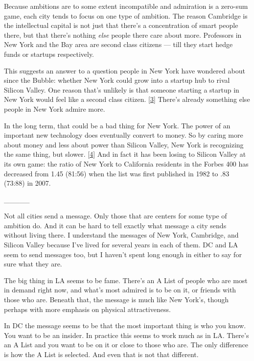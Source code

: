 Because ambitions are to some extent incompatible and admiration is a
zero-sum game, each city tends to focus on one type of ambition. The
reason Cambridge is the intellectual capital is not just that there's a
concentration of smart people there, but that there's nothing
\emph{else} people there care about more. Professors in New York and the
Bay area are second class citizens --- till they start hedge funds or
startups respectively.

This suggests an answer to a question people in New York have wondered
about since the Bubble: whether New York could grow into a startup hub
to rival Silicon Valley. One reason that's unlikely is that someone
starting a startup in New York would feel like a second class citizen.
{[}\hyperref[f3n]{3}{]} There's already something else people in New
York admire more.

In the long term, that could be a bad thing for New York. The power of
an important new technology does eventually convert to money. So by
caring more about money and less about power than Silicon Valley, New
York is recognizing the same thing, but slower. {[}\hyperref[f4n]{4}{]}
And in fact it has been losing to Silicon Valley at its own game: the
ratio of New York to California residents in the Forbes 400 has
decreased from 1.45 (81:56) when the list was first published in 1982 to
.83 (73:88) in 2007.

\_\_\_\_\_

Not all cities send a message. Only those that are centers for some type
of ambition do. And it can be hard to tell exactly what message a city
sends without living there. I understand the messages of New York,
Cambridge, and Silicon Valley because I've lived for several years in
each of them. DC and LA seem to send messages too, but I haven't spent
long enough in either to say for sure what they are.

The big thing in LA seems to be fame. There's an A List of people who
are most in demand right now, and what's most admired is to be on it, or
friends with those who are. Beneath that, the message is much like New
York's, though perhaps with more emphasis on physical attractiveness.

In DC the message seems to be that the most important thing is who you
know. You want to be an insider. In practice this seems to work much as
in LA. There's an A List and you want to be on it or close to those who
are. The only difference is how the A List is selected. And even that is
not that different.

